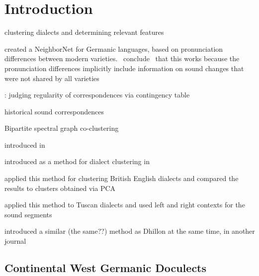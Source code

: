 \documentclass[a4paper]{article}
\begin{document}
\newpage
\tableofcontents
\listoftables
\listoffigures
\newpage



\section{Introduction}


clustering dialects and determining relevant features

\citet{prokic2012detecting}


\citet{heggarty2010splits} created a NeighborNet for Germanic languages, based on pronunciation differences between modern varieties. 
~conclude~ that this works because the pronunciation differences implicitly include information on sound changes that were not shared by all varieties

\citet{prokic2013combining}: judging regularity of correspondences via contingency table


historical sound correspondences



Bipartite spectral graph co-clustering

introduced in \citet{dhillon2001co-clustering}

introduced as a method for dialect clustering in \citet{wieling2011bipartite}

\citet{wieling2013analyzing} applied this method for clustering British English dialects and compared the results to clusters obtained via PCA
 
\citet{montemagni2013synchronic} applied this method to Tuscan dialects and used left and right contexts for the sound segments

\citet{zha2001bipartite} introduced a similar (the same??) method as Dhillon at the same time, in another journal


\subsection{Continental West Germanic Doculects}
\end{document}
